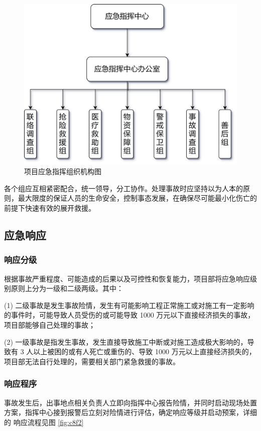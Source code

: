 \begin{figure}[thbp!]
    \centering
    \includegraphics[width=0.8\linewidth]{figure/c8f1.png}
    \caption{项目应急指挥组织机构图}
    \label{fig:c8f1}
\end{figure}

各个组应互相紧密配合，统一领导，分工协作。处理事故时应坚持以为人本的原则，最大限度的保证人员的生命安全，控制事态发展，在确保尽可能最小化伤亡的前提下快速有效的展开救援。

\subsection{应急响应}
\subsubsection{响应分级}

根据事故严重程度、可能造成的后果以及可控性和恢复能力，项目部将应急响应级别原则上分为一级和二级两级。其中：

(1) 二级事故是发生事故险情，发生有可能影响工程正常施工或对施工有一定影响的事件时，可能导致人员受伤的或可能导致 1000 万元以下直接经济损失的事故，项目部能够自己处理的事故；

(2) 一级事故是指发生事故，发生直接导致施工中断或对施工造成极大影响的，导致有 3 人以上被困的或有人死亡或重伤的、导致 1000 万元以上直接经济损失的，项目部无法自行处理的，需要相关部门紧急救援的事故。 

\subsubsection{响应程序}

事故发生后，出事地点相关负责人立即向指挥中心报告险情，并同时启动现场处置方案，指挥中心接到报警后立刻对险情进行评估，确定响应等级并启动预案，详细的
响应流程见图 \ref{fig:c8f2}

